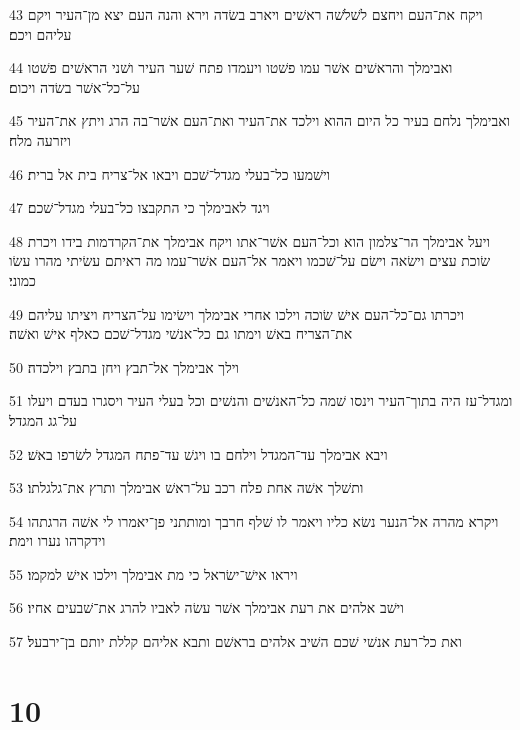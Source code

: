 \par 43 ויקח את־העם ויחצם לשׁלשׁה ראשׁים ויארב בשׂדה וירא והנה העם יצא מן־העיר ויקם עליהם ויכם׃
\par 44 ואבימלך והראשׁים אשׁר עמו פשׁטו ויעמדו פתח שׁער העיר ושׁני הראשׁים פשׁטו על־כל־אשׁר בשׂדה ויכום׃
\par 45 ואבימלך נלחם בעיר כל היום ההוא וילכד את־העיר ואת־העם אשׁר־בה הרג ויתץ את־העיר ויזרעה מלח׃
\par 46 וישׁמעו כל־בעלי מגדל־שׁכם ויבאו אל־צריח בית אל ברית׃
\par 47 ויגד לאבימלך כי התקבצו כל־בעלי מגדל־שׁכם׃
\par 48 ויעל אבימלך הר־צלמון הוא וכל־העם אשׁר־אתו ויקח אבימלך את־הקרדמות בידו ויכרת שׂוכת עצים וישׂאה וישׂם על־שׁכמו ויאמר אל־העם אשׁר־עמו מה ראיתם עשׂיתי מהרו עשׂו כמוני׃
\par 49 ויכרתו גם־כל־העם אישׁ שׂוכה וילכו אחרי אבימלך וישׂימו על־הצריח ויציתו עליהם את־הצריח באשׁ וימתו גם כל־אנשׁי מגדל־שׁכם כאלף אישׁ ואשׁה׃
\par 50 וילך אבימלך אל־תבץ ויחן בתבץ וילכדה׃
\par 51 ומגדל־עז היה בתוך־העיר וינסו שׁמה כל־האנשׁים והנשׁים וכל בעלי העיר ויסגרו בעדם ויעלו על־גג המגדל׃
\par 52 ויבא אבימלך עד־המגדל וילחם בו ויגשׁ עד־פתח המגדל לשׂרפו באשׁ׃
\par 53 ותשׁלך אשׁה אחת פלח רכב על־ראשׁ אבימלך ותרץ את־גלגלתו׃
\par 54 ויקרא מהרה אל־הנער נשׂא כליו ויאמר לו שׁלף חרבך ומותתני פן־יאמרו לי אשׁה הרגתהו וידקרהו נערו וימת׃
\par 55 ויראו אישׁ־ישׂראל כי מת אבימלך וילכו אישׁ למקמו׃
\par 56 וישׁב אלהים את רעת אבימלך אשׁר עשׂה לאביו להרג את־שׁבעים אחיו׃
\par 57 ואת כל־רעת אנשׁי שׁכם השׁיב אלהים בראשׁם ותבא אליהם קללת יותם בן־ירבעל׃

\chapter{10}

